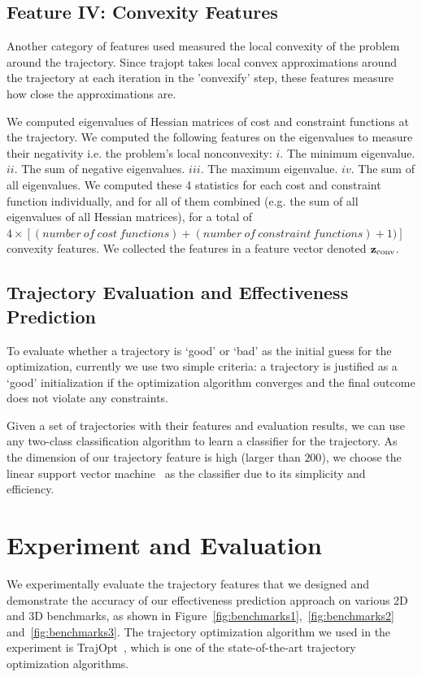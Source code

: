 \documentclass[letterpaper, 10 pt, conference]{ieeeconf}  %
\begin{document}
\subsection{Feature IV: Convexity Features}
	Another category of features used measured the local convexity of the problem around the trajectory. Since trajopt takes local convex approximations around the trajectory at each iteration in the 'convexify' step, these features measure how close the approximations are. 

	We computed eigenvalues of Hessian matrices of cost and constraint functions at the trajectory. We computed the following features on the eigenvalues to measure their negativity i.e. the problem's local nonconvexity: $i.$ The minimum eigenvalue. $ii.$ The sum of negative eigenvalues. $iii.$ The maximum eigenvalue. $iv.$ The sum of all eigenvalues. We computed these 4 statistics for each cost and constraint function individually, and for all of them combined (e.g. the sum of all eigenvalues of all Hessian matrices), for a total of $4 \times [(number\ of\ cost\ functions) + (number\ of\ constraint\ functions) + 1)]$ convexity features. We collected the features in a feature vector denoted ${\bf z}_\textrm{conv}$.

\subsection{Trajectory Evaluation and Effectiveness Prediction}
To evaluate whether a trajectory is `good' or `bad' as the initial guess for the optimization, currently we use two simple criteria: a trajectory is justified as a `good' initialization if the optimization algorithm converges and the final outcome does not violate any constraints. 

Given a set of trajectories with their features and evaluation results, we can use any two-class classification algorithm to learn a classifier for the trajectory. As the dimension of our trajectory feature is high (larger than $200$), we choose the linear support vector machine~\cite{Fan:2008:LLL} as the classifier due to its simplicity and efficiency.

\section{Experiment and Evaluation}
\label{sec:experiment}
We experimentally evaluate the trajectory features that we designed and demonstrate the accuracy of our effectiveness prediction approach on various 2D and 3D benchmarks, as shown in Figure~\ref{fig:benchmarks1},~\ref{fig:benchmarks2} and~\ref{fig:benchmarks3}. The trajectory optimization algorithm we used in the experiment is TrajOpt~\cite{Schulman:2013:FLO}, which is one of the state-of-the-art trajectory optimization algorithms.
\end{document}
